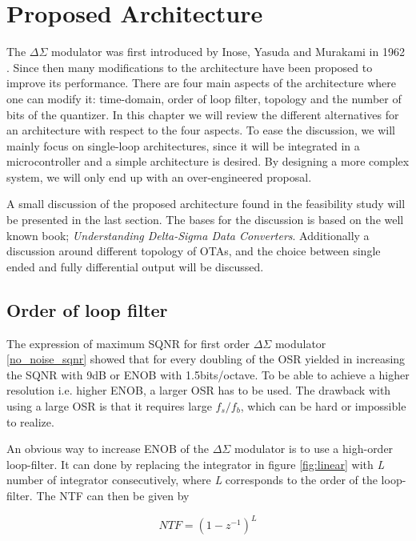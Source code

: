\chapter{Proposed Architecture}\label{architecture}

The $\Delta\Sigma$ modulator was first introduced by Inose, Yasuda and Murakami in 1962 \cite{first_delta}. Since then many modifications to the architecture have been proposed to improve its performance. There are four main aspects of the architecture where one can modify it: time-domain, order of loop filter, topology and the number of bits of the quantizer. In this chapter we will review the different alternatives for an architecture with respect to the four aspects. To ease the discussion, we will mainly focus on single-loop architectures, since it will be integrated in a microcontroller and a simple architecture is desired. By designing a more complex system, we will only end up with an over-engineered proposal. 

A small discussion of the proposed architecture found in the feasibility study will be presented in the last section. The bases for the discussion is based on the well known book; \textit{Understanding Delta-Sigma Data Converters}\cite{Richard}. Additionally a discussion around different topology of OTAs, and the choice between single ended and fully differential output will be discussed.  

\section{Order of loop filter}

The expression of maximum SQNR for first order $\Delta\Sigma$ modulator \ref{no_noise_sqnr} showed that for every doubling of the OSR yielded in increasing the SQNR with 9dB or ENOB with 1.5bits/octave. To be able to achieve a higher resolution i.e. higher ENOB, a larger OSR has to be used. The drawback with using a large OSR is that it requires large $f_s/f_b$, which can be hard or impossible to realize. 

An obvious way to increase ENOB of the $\Delta\Sigma$ modulator is to use a high-order loop-filter. It can done by replacing the integrator in figure \ref{fig:linear} with \textit{L} number of integrator consecutively, where \textit{L} corresponds to the order of the loop-filter. The NTF can then be given by

\begin{equation}
    NTF = (1-z^{-1})^L
\end{equation}

